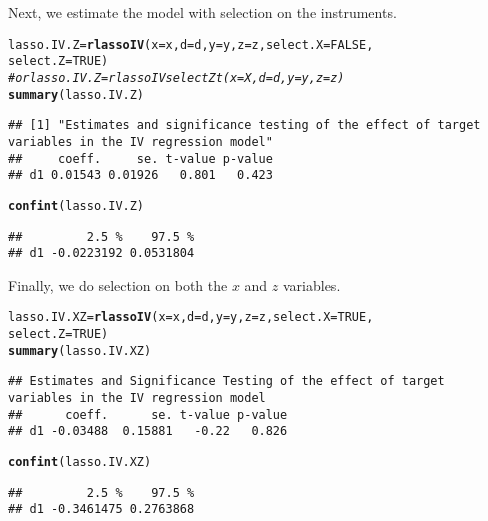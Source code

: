 \documentclass{amsart}\usepackage[]{graphicx}\usepackage[]{color}
\makeatletter
\newcommand{\hlnum}[1]{\textcolor[rgb]{0.686,0.059,0.569}{#1}}%
\newcommand{\hlcom}[1]{\textcolor[rgb]{0.678,0.584,0.686}{\textit{#1}}}%
\newcommand{\hlstd}[1]{\textcolor[rgb]{0.345,0.345,0.345}{#1}}%
\newcommand{\hlkwb}[1]{\textcolor[rgb]{0.69,0.353,0.396}{#1}}%
\newcommand{\hlkwc}[1]{\textcolor[rgb]{0.333,0.667,0.333}{#1}}%
\newcommand{\hlkwd}[1]{\textcolor[rgb]{0.737,0.353,0.396}{\textbf{#1}}}%
\newenvironment{kframe}{%
 \def\at@end@of@kframe{}%
 \ifinner\ifhmode%
  \def\at@end@of@kframe{\end{minipage}}%
  \begin{minipage}{\columnwidth}%
 \fi\fi%
 \def\FrameCommand##1{\hskip\@totalleftmargin \hskip-\fboxsep
 \colorbox{shadecolor}{##1}\hskip-\fboxsep
     \hskip-\linewidth \hskip-\@totalleftmargin \hskip\columnwidth}%
 \MakeFramed {\advance\hsize-\width
   \@totalleftmargin\z@ \linewidth\hsize
   \@setminipage}}%
 {\par\unskip\endMakeFramed%
 \at@end@of@kframe}
\newenvironment{knitrout}{}{} %
\makeatother
\begin{document}
Next, we estimate the model with selection on the instruments. 
\begin{knitrout}
\color{fgcolor}\begin{kframe}
\begin{alltt}
\hlstd{lasso.IV.Z} \hlkwb{=} \hlkwd{rlassoIV}\hlstd{(}\hlkwc{x} \hlstd{= x,} \hlkwc{d} \hlstd{= d,} \hlkwc{y} \hlstd{= y,} \hlkwc{z} \hlstd{= z,} \hlkwc{select.X} \hlstd{=} \hlnum{FALSE}\hlstd{,}
    \hlkwc{select.Z} \hlstd{=} \hlnum{TRUE}\hlstd{)}
\hlcom{# or lasso.IV.Z = rlassoIVselectZt(x=X, d=d, y=y, z=z)}
\hlkwd{summary}\hlstd{(lasso.IV.Z)}
\end{alltt}
\begin{verbatim}
## [1] "Estimates and significance testing of the effect of target variables in the IV regression model"
##     coeff.     se. t-value p-value
## d1 0.01543 0.01926   0.801   0.423
\end{verbatim}
\begin{alltt}
\hlkwd{confint}\hlstd{(lasso.IV.Z)}
\end{alltt}
\begin{verbatim}
##         2.5 %    97.5 %
## d1 -0.0223192 0.0531804
\end{verbatim}
\end{kframe}
\end{knitrout}


Finally, we do selection on both the $x$ and $z$ variables.
\begin{knitrout}
\color{fgcolor}\begin{kframe}
\begin{alltt}
\hlstd{lasso.IV.XZ} \hlkwb{=} \hlkwd{rlassoIV}\hlstd{(}\hlkwc{x} \hlstd{= x,} \hlkwc{d} \hlstd{= d,} \hlkwc{y} \hlstd{= y,} \hlkwc{z} \hlstd{= z,} \hlkwc{select.X} \hlstd{=} \hlnum{TRUE}\hlstd{,}
    \hlkwc{select.Z} \hlstd{=} \hlnum{TRUE}\hlstd{)}
\hlkwd{summary}\hlstd{(lasso.IV.XZ)}
\end{alltt}
\begin{verbatim}
## Estimates and Significance Testing of the effect of target variables in the IV regression model 
##      coeff.      se. t-value p-value
## d1 -0.03488  0.15881   -0.22   0.826
\end{verbatim}
\begin{alltt}
\hlkwd{confint}\hlstd{(lasso.IV.XZ)}
\end{alltt}
\begin{verbatim}
##         2.5 %    97.5 %
## d1 -0.3461475 0.2763868
\end{verbatim}
\end{kframe}
\end{knitrout}
\end{document}
